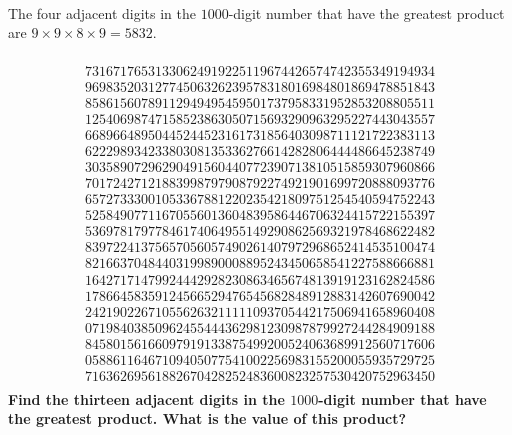 \begin{problem}

\end{problem}	

\begin{solution}

		\begin{lstlisting}[language=Haskell, caption="Haskell"]
        

		\end{lstlisting}  

\end{solution}	




\begin{problem}
The four adjacent digits in the $1000$-digit number that have the greatest product are $9 \times 9 \times 8 \times 9 = 5832$.

\begin{multline*}\\
73167176531330624919225119674426574742355349194934\\
96983520312774506326239578318016984801869478851843\\
85861560789112949495459501737958331952853208805511\\
12540698747158523863050715693290963295227443043557\\
66896648950445244523161731856403098711121722383113\\
62229893423380308135336276614282806444486645238749\\
30358907296290491560440772390713810515859307960866\\
70172427121883998797908792274921901699720888093776\\
65727333001053367881220235421809751254540594752243\\
52584907711670556013604839586446706324415722155397\\
53697817977846174064955149290862569321978468622482\\
83972241375657056057490261407972968652414535100474\\
82166370484403199890008895243450658541227588666881\\
16427171479924442928230863465674813919123162824586\\
17866458359124566529476545682848912883142607690042\\
24219022671055626321111109370544217506941658960408\\
07198403850962455444362981230987879927244284909188\\
84580156166097919133875499200524063689912560717606\\
05886116467109405077541002256983155200055935729725\\
71636269561882670428252483600823257530420752963450\\
\end{multline*}
\textbf{Find the thirteen adjacent digits in the $1000$-digit number that have the greatest product. What is the value of this product?}
\end{problem}	

